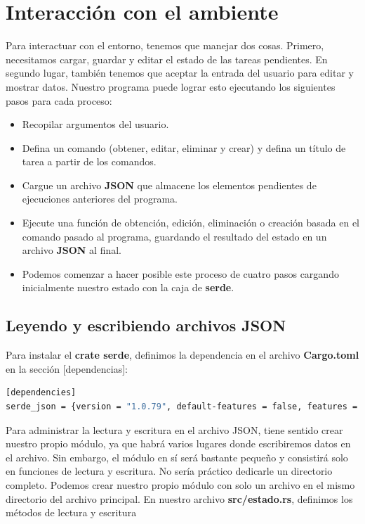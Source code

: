 \section{Interacción con el ambiente}

Para interactuar con el entorno, tenemos que manejar dos cosas. Primero, necesitamos cargar, guardar y editar el estado de las tareas pendientes. En segundo lugar, también tenemos que aceptar la entrada del usuario para editar y mostrar datos. Nuestro programa puede lograr esto ejecutando los siguientes pasos para cada proceso:

\begin{itemize}
	\item Recopilar argumentos del usuario.
	\item Defina un comando (obtener, editar, eliminar y crear) y defina un título de tarea a partir de los comandos.
	\item Cargue un archivo \textbf{JSON} que almacene los elementos pendientes de ejecuciones anteriores del programa.
	\item Ejecute una función de obtención, edición, eliminación o creación basada en el comando pasado al programa, guardando el resultado del estado en un archivo \textbf{JSON} al final.
	\item Podemos comenzar a hacer posible este proceso de cuatro pasos cargando inicialmente nuestro estado con la caja de \textbf{serde}.
\end{itemize}

\subsection{Leyendo y escribiendo archivos \textbf{JSON}}

Para instalar el \textbf{crate serde}, definimos la dependencia en el archivo \textbf{Cargo.toml} en la sección [dependencias]:

\begin{lstlisting}[language=bash]
[dependencies]
serde_json = {version = "1.0.79", default-features = false, features = ["alloc"]}
\end{lstlisting}

Para administrar la lectura y escritura en el archivo JSON, tiene sentido crear nuestro propio módulo, ya que habrá varios lugares donde escribiremos datos en el archivo. Sin embargo, el módulo en sí será bastante pequeño y consistirá solo en funciones de lectura y escritura. No sería práctico dedicarle un directorio completo. Podemos crear nuestro propio módulo con solo un archivo en el mismo directorio del archivo principal. En nuestro archivo \textbf{src/estado.rs}, definimos los métodos de lectura y escritura

